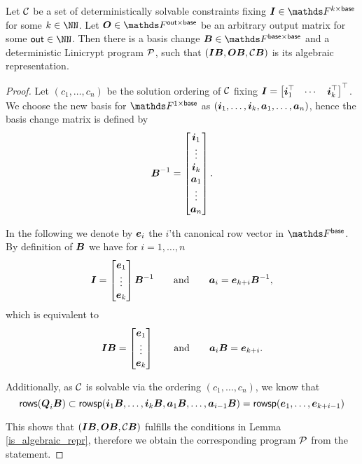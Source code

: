 \begin{lemma}
\label{det_solvable_lemma}
    Let $\C$ be a set of deterministically solvable constraints fixing $\Inp \in \F^{k \times \base}$ for some $k \in \NN$.
    Let $\O \in \F^{\out \times \base}$ be an arbitrary output matrix for some $\out \in \NN$.
    Then there is a basis change $\B \in \F^{\base \times \base}$
    and a deterministic Linicrypt program $\P$,
    such that $(\Inp \B, \O \B, \C \B)$ is its algebraic representation.
\end{lemma}

\begin{proof}
Let $(c_1, \dots, c_n)$ be the solution ordering of $\C$ fixing $\I = \mtdts \vi k$.
We choose the new basis for $\Frowsp$ as $(\dts \vi k, \dts \va n)$, hence the basis change matrix is defined by
\[
    \B^{-1} = 
    \begin{bmatrix}
\vi_1 \\
\vdots \\
\vi_k \\
\va_1 \\
\vdots \\
\va_n
    \end{bmatrix}.
\]

In the following we denote by $\v e_i$ the $i$'th canonical row vector in $\Fsp$.
By definition of $\B$ we have for $i=1, \dots, n$
\begin{equation*}
\I = \begin{bmatrix}
    \v e_1 \\
    \vdots \\
    \v e_k
\end{bmatrix} \B^{-1}
\qquad \textrm{and} \qquad
\va_i = \v e_{k+i} \B^{-1},
\end{equation*}
which is equivalent to
\begin{equation*}
\I \B = \begin{bmatrix}
    \v e_1 \\
    \vdots \\
    \v e_k
\end{bmatrix}
\qquad \textrm{and} \qquad
\va_i \B = \v e_{k+i}.
\end{equation*}

Additionally, as $\C$ is solvable via the ordering $(c_1, \dots, c_n)$,
we know that 
\[
\rows(\Q_i \B) \subset \rowsp(\vi_1 \B, \dots, \vi_k \B, \va_1 \B, \dots, \va_{i-1} \B) = \rowsp( \ve_1, \dots, \ve_{k+i-1} )
\]

This shows that $(\I\B, \O\B, \C\B)$ fulfills the conditions in Lemma \ref{is_algebraic_repr},
therefore we obtain the corresponding program $\P$ from the statement.
\end{proof}

